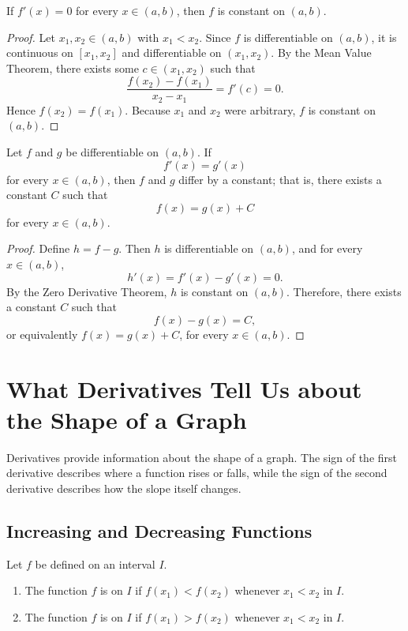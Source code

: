 \begin{theorem}
    If \(f'(x)=0\) for every \(x\in(a,b)\), then \(f\) is constant on
    \((a,b)\).
\end{theorem}
\begin{proof}
    Let \(x_1,x_2\in(a,b)\) with \(x_1<x_2\).  Since \(f\) is
    differentiable on \((a,b)\), it is continuous on \([x_1,x_2]\) and
    differentiable on \((x_1,x_2)\).  By the Mean Value Theorem, there
    exists some \(c\in(x_1,x_2)\) such that
    \[
        \frac{f(x_2)-f(x_1)}{x_2-x_1}=f'(c)=0.
    \]
    Hence \(f(x_2)=f(x_1)\).  Because \(x_1\) and \(x_2\) were arbitrary,
    \(f\) is constant on \((a,b)\).
\end{proof}

\begin{corollary}
    Let \(f\) and \(g\) be differentiable on \((a,b)\).  If
    \[
        f'(x)=g'(x)
    \]
    for every \(x\in(a,b)\), then \(f\) and \(g\) differ by a constant;
    that is, there exists a constant \(C\) such that
    \[
        f(x)=g(x)+C
    \]
    for every \(x\in(a,b)\).
\end{corollary}
\begin{proof}
    Define \(h=f-g\).  Then \(h\) is differentiable on \((a,b)\), and
    for every \(x\in(a,b)\),
    \[
        h'(x)=f'(x)-g'(x)=0.
    \]
    By the Zero Derivative Theorem, \(h\) is constant on \((a,b)\).
    Therefore, there exists a constant \(C\) such that
    \[
        f(x)-g(x)=C,
    \]
    or equivalently \(f(x)=g(x)+C\), for every \(x\in(a,b)\).
\end{proof}

\section{What Derivatives Tell Us about the Shape of a Graph}

Derivatives provide information about the shape of a graph.  The sign of
the first derivative describes where a function rises or falls, while the
sign of the second derivative describes how the slope itself changes.

\subsection{Increasing and Decreasing Functions}

\begin{definition}
    Let \(f\) be defined on an interval \(I\).
    \begin{enumerate}
        \item The function \(f\) is  on \(I\) if
        \(f(x_1)<f(x_2)\) whenever \(x_1<x_2\) in \(I\).
        \item The function \(f\) is  on \(I\) if
        \(f(x_1)>f(x_2)\) whenever \(x_1<x_2\) in \(I\).
    \end{enumerate}
\end{definition}

